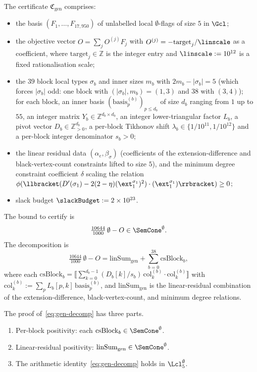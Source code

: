 \documentclass[11pt,a4paper]{article}
\theoremstyle{definition}
\theoremstyle{remark}
\begin{document}
The certificate $\mathfrak{C}_{\mathrm{gen}}$ comprises:
\begin{itemize}
\item the basis $(F_1, \dots, F_{17{,}950})$ of unlabelled
local $\emptyset$-flags of size $5$ in $\Gcl$;
\item the objective vector $O = \sum_j O^{(j)} F_j$ with
$O^{(j)} = -\mathrm{target}_j / \linscale$ as a coefficient,
where $\mathrm{target}_j \in \mathbb{Z}$ is the integer entry and
$\linscale := 10^{12}$ is a fixed rationalisation scale;
\item the $39$ block local types $\sigma_b$ and inner sizes
$m_b$ with $2 m_b - |\sigma_b| = 5$ (which forces $|\sigma_b|$ odd:
one block with $(|\sigma_b|, m_b) = (1, 3)$ and $38$ with $(3, 4)$);
for each block, an inner
basis $(\mathrm{basis}^{(b)}_p)_{p \leq d_b}$ of size $d_b$ ranging
from $1$ up to $55$, an integer matrix
$Y_b \in \mathbb{Z}^{d_b \times d_b}$, an integer lower-triangular
factor $L_b$, a pivot vector $D_b \in \mathbb{Z}_{>0}^{d_b}$, a
per-block Tikhonov shift
$\lambda_b \in \{1/10^{11}, 1/10^{12}\}$ and a per-block integer
denominator $s_b > 0$;
\item the linear residual data
$(\alpha_{e}, \beta_\sigma)$ (coefficients of the
extension-difference and black-vertex-count constraints lifted to
size $5$), and the minimum degree constraint coefficient
$\delta$ scaling the relation
$\phi(\llbracket(D'(\sigma_1) - 2(2-\eta)(\ext_1^{\sigma_1})^2)
\cdot (\ext_1^{\sigma_1})\rrbracket) \geq 0$;
\item slack budget $\slackBudget := 2 \times 10^{23}$.
\end{itemize}

The bound to certify is
\[
\tfrac{10644}{1000}\,\emptyset - O
\in \SemCone^\emptyset.
\]
The decomposition is
\begin{equation}
\label{eq:gen-decomp}
\tfrac{10644}{1000}\,\emptyset - O
= \mathrm{linSum}_{\mathrm{gen}}
+ \sum_{b=0}^{38} \mathrm{csBlock}_b,
\end{equation}
where each $\mathrm{csBlock}_b = \llbracket\sum_{k=0}^{d_b - 1}
(D_b[k]/s_b)\,\mathrm{col}_k^{(b)} \cdot \mathrm{col}_k^{(b)}
\rrbracket$ with $\mathrm{col}_k^{(b)} := \sum_p
L_b[p, k]\,\mathrm{basis}^{(b)}_p$, and
$\mathrm{linSum}_{\mathrm{gen}}$ is the linear-residual combination
of the extension-difference, black-vertex-count, and
minimum degree relations.

The proof of~\eqref{eq:gen-decomp} has three parts.
\begin{enumerate}[label=\textup{(C\arabic*)}]
\item \label{c1-gen} Per-block positivity: each
$\mathrm{csBlock}_b \in \SemCone^\emptyset$.
\item \label{c2-gen} Linear-residual positivity:
$\mathrm{linSum}_{\mathrm{gen}} \in \SemCone^\emptyset$.
\item \label{c3-gen} The arithmetic identity~\eqref{eq:gen-decomp}
holds in $\Lcl^\emptyset_5$.
\end{enumerate}
\end{document}
